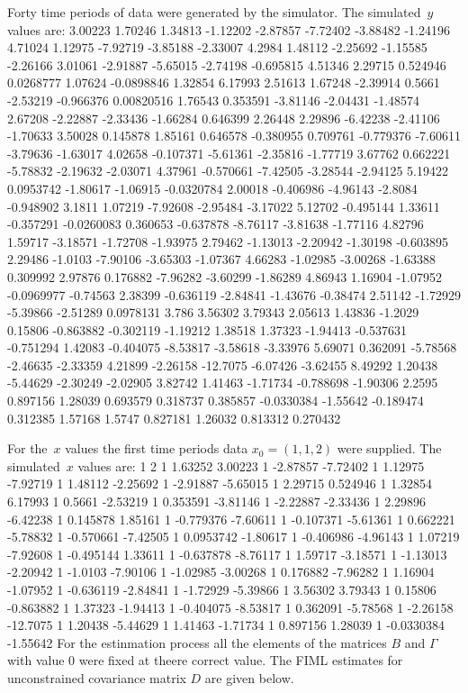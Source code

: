 Forty time periods of data were generated by the simulator.
The simulated~$y$ values are:
 3.00223 1.70246 1.34813 -1.12202
 -2.87857 -7.72402 -3.88482 -1.24196 4.71024
 1.12975 -7.92719 -3.85188 -2.33007 4.2984
 1.48112 -2.25692 -1.15585 -2.26166 3.01061
 -2.91887 -5.65015 -2.74198 -0.695815 4.51346
 2.29715 0.524946 0.0268777 1.07624 -0.0898846
 1.32854 6.17993 2.51613 1.67248 -2.39914
 0.5661 -2.53219 -0.966376 0.00820516 1.76543
 0.353591 -3.81146 -2.04431 -1.48574 2.67208
 -2.22887 -2.33436 -1.66284 0.646399 2.26448
 2.29896 -6.42238 -2.41106 -1.70633 3.50028
 0.145878 1.85161 0.646578 -0.380955 0.709761
 -0.779376 -7.60611 -3.79636 -1.63017 4.02658
 -0.107371 -5.61361 -2.35816 -1.77719 3.67762
 0.662221 -5.78832 -2.19632 -2.03071 4.37961
 -0.570661 -7.42505 -3.28544 -2.94125 5.19422
 0.0953742 -1.80617 -1.06915 -0.0320784 2.00018
 -0.406986 -4.96143 -2.8084 -0.948902 3.1811
 1.07219 -7.92608 -2.95484 -3.17022 5.12702
 -0.495144 1.33611 -0.357291 -0.0260083 0.360653
 -0.637878 -8.76117 -3.81638 -1.77116 4.82796
 1.59717 -3.18571 -1.72708 -1.93975 2.79462
 -1.13013 -2.20942 -1.30198 -0.603895 2.29486
 -1.0103 -7.90106 -3.65303 -1.07367 4.66283
 -1.02985 -3.00268 -1.63388 0.309992 2.97876
 0.176882 -7.96282 -3.60299 -1.86289 4.86943
 1.16904 -1.07952 -0.0969977 -0.74563 2.38399
 -0.636119 -2.84841 -1.43676 -0.38474 2.51142
 -1.72929 -5.39866 -2.51289 0.0978131 3.786
 3.56302 3.79343 2.05613 1.43836 -1.2029
 0.15806 -0.863882 -0.302119 -1.19212 1.38518
 1.37323 -1.94413 -0.537631 -0.751294 1.42083
 -0.404075 -8.53817 -3.58618 -3.33976 5.69071
 0.362091 -5.78568 -2.46635 -2.33359 4.21899
 -2.26158 -12.7075 -6.07426 -3.62455 8.49292
 1.20438 -5.44629 -2.30249 -2.02905 3.82742
 1.41463 -1.71734 -0.788698 -1.90306 2.2595
 0.897156 1.28039 0.693579 0.318737 0.385857
 -0.0330384 -1.55642 -0.189474 0.312385 1.57168
 1.5747 0.827181 1.26032 0.813312 0.270432
\endexample

For the~$x$ values the first time periods data $x_0 =(1,1,2)$
were supplied.  The simulated~$x$ values are:
 1 2
 1 1.63252 3.00223
 1 -2.87857 -7.72402
 1 1.12975 -7.92719
 1 1.48112 -2.25692
 1 -2.91887 -5.65015
 1 2.29715 0.524946
 1 1.32854 6.17993
 1 0.5661 -2.53219
 1 0.353591 -3.81146
 1 -2.22887 -2.33436
 1 2.29896 -6.42238
 1 0.145878 1.85161
 1 -0.779376 -7.60611
 1 -0.107371 -5.61361
 1 0.662221 -5.78832
 1 -0.570661 -7.42505
 1 0.0953742 -1.80617
 1 -0.406986 -4.96143
 1 1.07219 -7.92608
 1 -0.495144 1.33611
 1 -0.637878 -8.76117
 1 1.59717 -3.18571
 1 -1.13013 -2.20942
 1 -1.0103 -7.90106
 1 -1.02985 -3.00268
 1 0.176882 -7.96282
 1 1.16904 -1.07952
 1 -0.636119 -2.84841
 1 -1.72929 -5.39866
 1 3.56302 3.79343
 1 0.15806 -0.863882
 1 1.37323 -1.94413
 1 -0.404075 -8.53817
 1 0.362091 -5.78568
 1 -2.26158 -12.7075
 1 1.20438 -5.44629
 1 1.41463 -1.71734
 1 0.897156 1.28039
 1 -0.0330384 -1.55642
\endexample
{} 
For the estinmation process all the elements of the matrices
$B$ and $\Gamma$ with value $0$ were fixed at theere correct value.
The FIML estimates for unconstrained covariance matrix $D$ are given
below.

